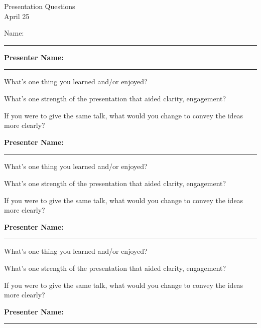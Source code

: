 \documentclass[11pt]{article}
\begin{document}
\begin{center}
\huge{Presentation Questions}\\ \medskip \Large{April 25}
\end{center}

\bigskip \bigskip
\noindent
Name: \rule{10cm}{1pt}

\bigskip \bigskip
\noindent
\textbf{Presenter Name:} \rule{10cm}{1pt}

\bigskip
\noindent
What's one thing you learned and/or enjoyed?

\vspace{0.75in}

\noindent
What's one strength of the presentation that aided clarity, engagement?

\vspace{0.75in}

\noindent
If you were to give the same talk, what would you change to convey the ideas more clearly?

\vspace{1in}
\noindent
\textbf{Presenter Name:} \rule{10cm}{1pt}

\bigskip
\noindent
What's one thing you learned and/or enjoyed?

\vspace{0.75in}

\noindent
What's one strength of the presentation that aided clarity, engagement?

\vspace{0.75in}

\noindent
If you were to give the same talk, what would you change to convey the ideas more clearly?

\pagebreak
\noindent
\textbf{Presenter Name:} \rule{10cm}{1pt}

\bigskip
\noindent
What's one thing you learned and/or enjoyed?

\vspace{0.75in}

\noindent
What's one strength of the presentation that aided clarity, engagement?

\vspace{0.75in}

\noindent
If you were to give the same talk, what would you change to convey the ideas more clearly?

\vspace{1in}
\noindent
\textbf{Presenter Name:} \rule{10cm}{1pt}
\end{document}
